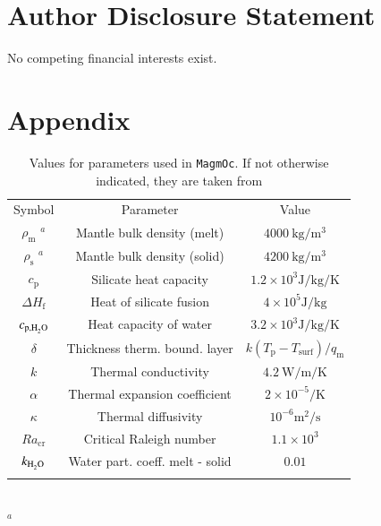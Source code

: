 \documentclass[paper=letterpaper,fontsize=12pt,oneside,twocolumn]{article}
\newcommand{\magmoc}{\texttt{\footnotesize{MagmOc}}}
\begin{document}
\section*{Author Disclosure Statement}
No competing financial interests exist.     




\onecolumn
\section*{Appendix}

\begin{table}[h]
    \caption[Values model]{Values for parameters used in \magmoc{}. If not otherwise indicated, they are taken from \citet{Schaefer2016}}
    \begin{tabular}{ccc}
    	\noalign{\smallskip}
    	\hline
    	\noalign{\smallskip}
    	Symbol & Parameter & Value \\ 
    	\noalign{\smallskip}
    	\hline \hline
    	\noalign{\smallskip}
    	$\rho_\mathrm{m}$  ${}^{a}$ & Mantle bulk density (melt)& $\SI{4000}{\kilogram\per\cubic\metre}$\\
    	$\rho_\mathrm{s}$  ${}^{a}$ & Mantle bulk density (solid)& $\SI{4200}{\kilogram\per\cubic\metre}$\\
    	$c_\mathrm{p} $ & Silicate heat capacity & $1.2 \times 10^3 \si{\joule\per\kilogram\per\kelvin}$ \\
    	$\Delta H_\mathrm{f}$ & Heat of silicate fusion & $4 \times 10^5 \si{\joule\per\kilogram}$ \\
    	$c_{\mathrm{p},\ce{H2O}} $ & Heat capacity of water & $3.2 \times 10^3 \si{\joule\per\kilogram\per\kelvin}$\\
    	$\delta$ &Thickness therm. bound. layer & $k (T_\mathrm{p} - T_\mathrm{surf}) / q_\mathrm{m} $\\
    	$k$ & Thermal conductivity & $\SI{4.2}{\watt\per\metre\per\kelvin}$\\
    	$\alpha$ & Thermal expansion coefficient & $2 \times 10^{-5} \si{\per\kelvin}$ \\
    	$\kappa$ & Thermal diffusivity & $10^{-6} \si{\metre\squared\per\second}$ \\
    	$Ra_\mathrm{cr}$ & Critical Raleigh number & $1.1 \times 10^3$ \\
    	$k_{\ce{H2O}}$ & Water part. coeff. melt - solid & $0.01$\\
    	\noalign{\smallskip}
    	\hline
    \end{tabular}
    \\
    ${}^{a}$ \citet{Lebrun2013}
    \label{Tab_Therm_Model_Value}
\end{table}
\end{document}
